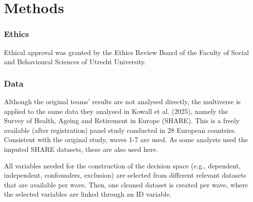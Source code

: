 \documentclass[
  letterpaper,
  DIV=11,
  numbers=noendperiod]{scrartcl}
\begin{document}
\section{Methods}\label{methods}

\subsubsection{Ethics}\label{ethics}

Ethical approval was granted by the Ethics Review Board of the Faculty
of Social and Behavioural Sciences of Utrecht University.

\subsubsection{Data}\label{data}

Although the original teams' results are not analysed directly, the
multiverse is applied to the same data they analysed in Kowall et al.
(2025), namely the Survey of Health, Ageing and Retirement in Europe
(SHARE). This is a freely available (after registration) panel study
conducted in 28 European countries. Consistent with the original study,
waves 1-7 are used. As some analysts used the imputed SHARE datasets,
these are also used here.

All variables needed for the construction of the decision space (e.g.,
dependent, independent, confounders, exclusion) are selected from
different relevant datasets that are available per wave. Then, one
cleaned dataset is created per wave, where the selected variables are
linked through an ID variable.
\end{document}
